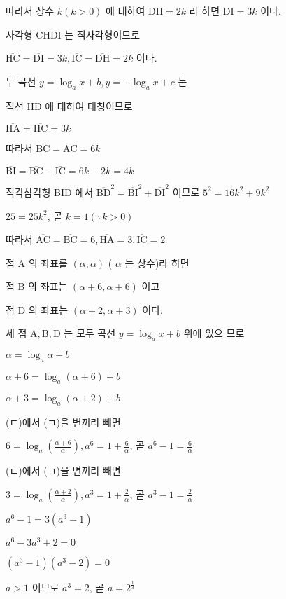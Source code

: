 \documentclass[10pt]{article}
\begin{document}
따라서 상수 \(k(k>0)\) 에 대하여 \(\overline{\mathrm{DH}}=2 k\) 라 하면 \(\overline{\mathrm{DI}}=3 k\) 이다.

사각형 CHDI 는 직사각형이므로

\(\overline{\mathrm{HC}}=\overline{\mathrm{DI}}=3 k, \overline{\mathrm{IC}}=\overline{\mathrm{DH}}=2 k\) 이다.

두 곡선 \(y=\log _{a} x+b, y=-\log _{a} x+c\) 는

직선 HD 에 대하여 대칭이므로

\(\overline{\mathrm{HA}}=\overline{\mathrm{HC}}=3 k\)

따라서 \(\overline{\mathrm{BC}}=\overline{\mathrm{AC}}=6 k\)

\(\overline{\mathrm{BI}}=\overline{\mathrm{BC}}-\overline{\mathrm{IC}}=6 k-2 k=4 k\)

직각삼각형 BID 에서 \(\overline{\mathrm{BD}}^{2}=\overline{\mathrm{BI}}^{2}+\overline{\mathrm{DI}}^{2}\) 이므로 \(5^{2}=16 k^{2}+9 k^{2}\)

\(25=25 k^{2}\), 곧 \(k=1(\because k>0)\)

따라서 \(\overline{\mathrm{AC}}=\overline{\mathrm{BC}}=6, \overline{\mathrm{HA}}=3, \overline{\mathrm{IC}}=2\)

점 A 의 좌표를 \((\alpha, \alpha)\) ( \(\alpha\) 는 상수)라 하면

점 B 의 좌표는 \((\alpha+6, \alpha+6)\) 이고

점 D 의 좌표는 \((\alpha+2, \alpha+3)\) 이다.

세 점 \(\mathrm{A}, \mathrm{B}, \mathrm{D}\) 는 모두 곡선 \(y=\log _{a} x+b\) 위에 있으 므로

\(\alpha=\log _{a} \alpha+b\)

\(\alpha+6=\log _{a}(\alpha+6)+b\)

\(\alpha+3=\log _{a}(\alpha+2)+b\)

(ㄷ)에서 (ㄱ)을 변끼리 빼면

\(6=\log _{a}\left(\frac{\alpha+6}{\alpha}\right), a^{6}=1+\frac{6}{\alpha}\), 곧 \(a^{6}-1=\frac{6}{\alpha}\)

(ㄷ)에서 (ㄱ)을 변끼리 빼면

\(3=\log _{a}\left(\frac{\alpha+2}{\alpha}\right), a^{3}=1+\frac{2}{\alpha}\), 곧 \(a^{3}-1=\frac{2}{\alpha}\)

\(a^{6}-1=3\left(a^{3}-1\right)\)

\(a^{6}-3 a^{3}+2=0\)

\(\left(a^{3}-1\right)\left(a^{3}-2\right)=0\)

\(a>1\) 이므로 \(a^{3}=2\), 곧 \(a=2^{\frac{1}{3}}\)
\end{document}
